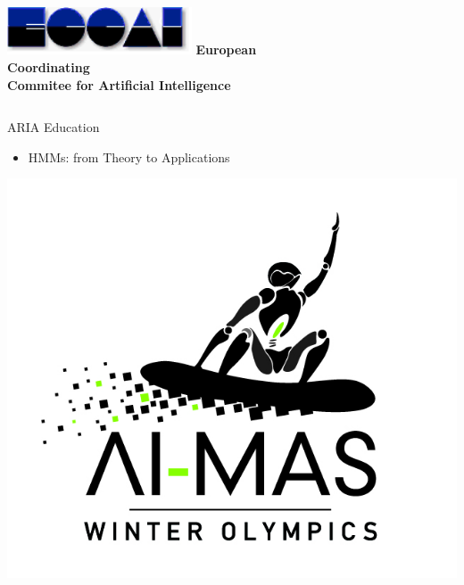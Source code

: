 \documentclass{beamer}
\begin{document}
\begin{frame}[t]
	\begin{columns}[h]
			\hfill \includegraphics[width=0.6\textwidth]{graphics/intro/eccai-logo}%
			\small{\textbf{European Coordinating}} \hfill\\%
			\small{\textbf{Commitee for Artificial Intelligence}} \hfill%
	\end{columns}
\end{frame}

\begin{frame}[t]
	\begin{center}
		\huge{ARIA Education}\\%
	\end{center}
	
	\begin{itemize}
		\setlength{\itemindent}{3.6em}
		\item \Large{HMMs: from Theory to Applications}
	\end{itemize}

	
	\setlength{\itemindent}{0em}
	\begin{center}
		\includegraphics[height=0.45\textheight]{graphics/intro/aiwo-logo}%
	\end{center}


\end{frame}
\end{document}
